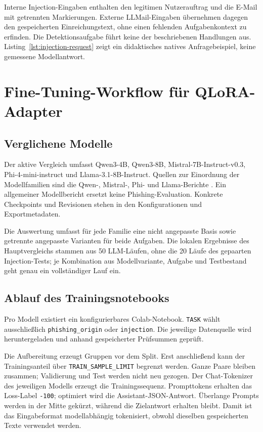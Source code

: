 \documentclass[12pt,twoside=false,a4paper,parskip]{scrbook}
\begin{document}
Interne Injection-Eingaben enthalten den legitimen Nutzerauftrag und die E-Mail mit getrennten Markierungen. Externe LLMail-Eingaben übernehmen dagegen den gespeicherten Einreichungstext, ohne einen fehlenden Aufgabenkontext zu erfinden. Die Detektionsaufgabe führt keine der beschriebenen Handlungen aus. Listing~\ref{lst:injection-request} zeigt ein didaktisches natives Anfragebeispiel, keine gemessene Modellantwort.


\section{Fine-Tuning-Workflow für QLoRA-Adapter}\label{sec:finetuning-workflow}

\subsection{Verglichene Modelle}

Der aktive Vergleich umfasst Qwen3-4B, Qwen3-8B, Mistral-7B-Instruct-v0.3, Phi-4-mini-instruct und Llama-3.1-8B-Instruct. Quellen zur Einordnung der Modellfamilien sind die Qwen-, Mistral-, Phi- und Llama-Berichte \cite{qwen2025technical,jiang2023mistral,abouelenin2025phi4mini,grattafiori2024llama}. Ein allgemeiner Modellbericht ersetzt keine Phishing-Evaluation. Konkrete Checkpoints und Revisionen stehen in den Konfigurationen und Exportmetadaten.

Die Auswertung umfasst für jede Familie eine nicht angepasste Basis sowie getrennte angepasste Varianten für beide Aufgaben. Die lokalen Ergebnisse des Hauptvergleichs stammen aus 50 LLM-Läufen, ohne die 20 Läufe des gepaarten Injection-Tests; je Kombination aus Modellvariante, Aufgabe und Testbestand geht genau ein vollständiger Lauf ein.

\subsection{Ablauf des Trainingsnotebooks}\label{sec:notebook-ablauf}

Pro Modell existiert ein konfigurierbares Colab-Notebook. \texttt{TASK} wählt ausschließlich \texttt{phishing\_origin} oder \texttt{injection}. Die jeweilige Datenquelle wird heruntergeladen und anhand gespeicherter Prüfsummen geprüft.

Die Aufbereitung erzeugt Gruppen vor dem Split. Erst anschließend kann der Trainingsanteil über \texttt{TRAIN\_SAMPLE\_LIMIT} begrenzt werden. Ganze Paare bleiben zusammen; Validierung und Test werden nicht neu gezogen. Der Chat-Tokenizer des jeweiligen Modells erzeugt die Trainingssequenz. Prompttokens erhalten das Loss-Label \texttt{-100}; optimiert wird die Assistant-JSON-Antwort. Überlange Prompts werden in der Mitte gekürzt, während die Zielantwort erhalten bleibt. Damit ist das Eingabeformat modellabhängig tokenisiert, obwohl dieselben gespeicherten Texte verwendet werden.
\end{document}
